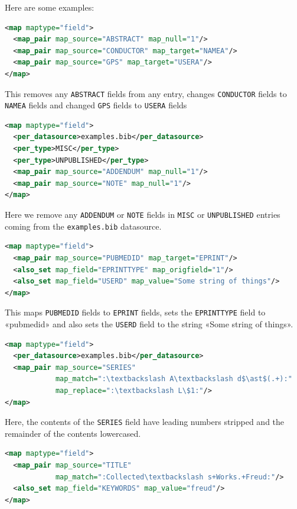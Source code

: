 \documentclass{ltxdockit}
\begin{document}
\noindent Here are some examples:

\begin{lstlisting}[language=xml,escapechar=:,mathescape=true]
<map maptype="field">
  <map_pair map_source="ABSTRACT" map_null="1"/>
  <map_pair map_source="CONDUCTOR" map_target="NAMEA"/>
  <map_pair map_source="GPS" map_target="USERA"/>
</map>
\end{lstlisting}

\noindent This removes any \verb+ABSTRACT+ fields from any entry, changes
\verb+CONDUCTOR+ fields to \verb+NAMEA+ fields and changed \verb+GPS+
fields to \verb+USERA+ fields

\begin{lstlisting}[language=xml,escapechar=:,mathescape=true]
<map maptype="field">
  <per_datasource>examples.bib</per_datasource>
  <per_type>MISC</per_type>
  <per_type>UNPUBLISHED</per_type>
  <map_pair map_source="ADDENDUM" map_null="1"/>
  <map_pair map_source="NOTE" map_null="1"/>
</map>
\end{lstlisting}

\noindent Here we remove any \verb+ADDENDUM+ or \verb+NOTE+ fields in
\verb+MISC+ or \verb+UNPUBLISHED+ entries coming from the
\verb+examples.bib+ datasource.

\begin{lstlisting}[language=xml,escapechar=:,mathescape=true]
<map maptype="field">
  <map_pair map_source="PUBMEDID" map_target="EPRINT"/>
  <also_set map_field="EPRINTTYPE" map_origfield="1"/>
  <also_set map_field="USERD" map_value="Some string of things"/>
</map>
\end{lstlisting}

\noindent This maps \verb+PUBMEDID+ fields to \verb+EPRINT+ fields, sets
the \verb+EPRINTTYPE+ field to «pubmedid» and also sets the \verb+USERD+
field to the string «Some string of things».

\begin{lstlisting}[language=xml,escapechar=:,mathescape=true]
<map maptype="field">
  <per_datasource>examples.bib</per_datasource>
  <map_pair map_source="SERIES"
            map_match=":\textbackslash A\textbackslash d$\ast$(.+):"
            map_replace=":\textbackslash L\$1:"/>
</map>
\end{lstlisting}

\noindent Here, the contents of the \verb+SERIES+
field have leading numbers stripped and the remainder of the contents
lowercased.

\begin{lstlisting}[language=xml,escapechar=:,mathescape=true]
<map maptype="field">
  <map_pair map_source="TITLE"
            map_match=":Collected\textbackslash s+Works.+Freud:"/>
  <also_set map_field="KEYWORDS" map_value="freud"/>
</map>
\end{lstlisting}
\end{document}
